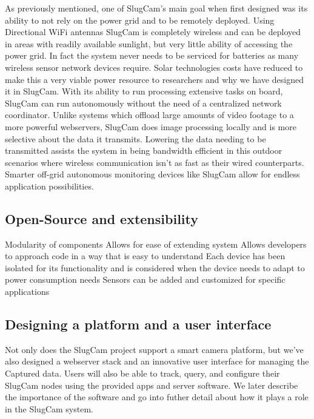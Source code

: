 \documentclass[10pt,conference]{IEEEtran}
\begin{document}
As previously mentioned, one of SlugCam's main goal when first designed was its ability to not rely on the power grid and to be remotely deployed. Using Directional WiFi antennas SlugCam is completely wireless and can be deployed in areas with readily available sunlight, but very little ability of accessing the power grid. In fact the system never needs to be serviced for batteries as many wireless sensor network devices require. Solar technologies costs have reduced to make this a very viable power resource to researchers and why we have designed it in SlugCam. With its ability to run processing extensive tasks on board, SlugCam can run autonomously without the need of a centralized network coordinator. Unlike systems which offload large amounts of video footage to a more powerful webservers, SlugCam does image processing locally and is more selective about the data it transmits. Lowering the data needing to be transmitted assists the system in being bandwidth efficient in this outdoor scenarios where wireless communication isn't as fast as their wired counterparts. Smarter off-grid autonomous monitoring devices like SlugCam allow for endless application possibilities.
	
	\subsection{Open-Source and extensibility}
Modularity of components
Allows for ease of extending system
Allows developers to approach code in a way that is easy to understand
Each device has been isolated for its functionality and is considered when the device needs to adapt to power consumption needs
Sensors can be added and customized for specific applications

	\subsection{Designing a platform and a user interface}
Not only does the SlugCam project support a smart camera platform, but we've also designed a webserver stack and an innovative user interface for managing the Captured data. Users will also be able to track, query, and configure their SlugCam nodes using the provided apps and server software. We later describe the importance of the software and go into futher detail about how it plays a role in the SlugCam system.



\end{document}

